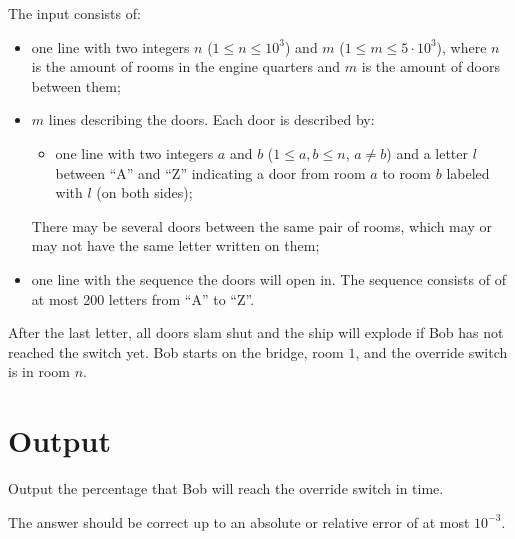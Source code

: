 The input consists of:
\begin{itemize}
\item one line with two integers $n$ ($1\leq n\leq 10^3$) and $m$ ($1\leq m\leq 5\cdot 10^3$), where $n$ is the amount of rooms in the engine quarters and $m$ is the amount of doors between them;
\item $m$ lines describing the doors. Each door is described by:
\begin{itemize}
\item one line with two integers $a$ and $b$ ($1\leq a, b \leq n$, $a\neq b$) and a letter $l$ between ``A'' and ``Z'' indicating a door from room $a$ to room $b$ labeled with $l$ (on both sides);
\end{itemize}
There may be several doors between the same pair of rooms, which may or may not have the same letter written on them;
\item one line with the sequence the doors will open in. The sequence consists of of at most 200 letters from ``A'' to ``Z''.
\end{itemize}

After the last letter, all doors slam shut and the ship will explode if Bob has not reached the switch yet. Bob starts on the bridge, room $1$, and the override switch is in room $n$.

\section*{Output}

Output the percentage that Bob will reach the override switch in time.

The answer should be correct up to an absolute or relative error of at most $10^{-3}$.
